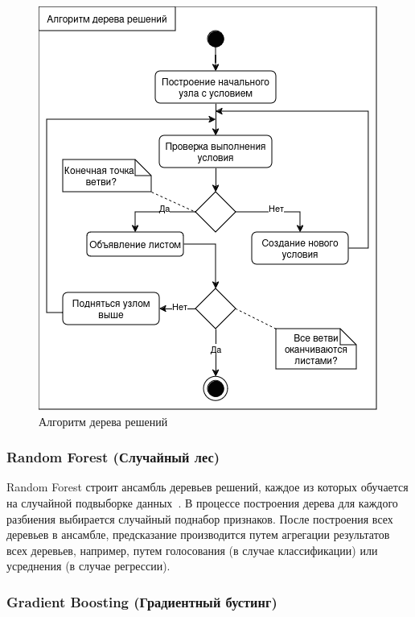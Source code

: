 \begin{figure}[H]
    \centering
    \includegraphics[width=0.9\linewidth]{pic/activity.png}
    \vspace{1em}\caption{Алгоритм дерева решений}
    \label{ris:activity}
\end{figure}
\vspace{1em}

\subsubsection*{Random Forest (Случайный лес)}

Random Forest строит ансамбль деревьев решений, каждое из которых обучается на случайной подвыборке данных~\cite{breiman2001random}. В процессе построения дерева для каждого разбиения выбирается случайный поднабор признаков. После построения всех деревьев в ансамбле, предсказание производится путем агрегации результатов всех деревьев, например, путем голосования (в случае классификации) или усреднения (в случае регрессии).
\vspace{1em}

\subsubsection*{Gradient Boosting (Градиентный бустинг)} 

